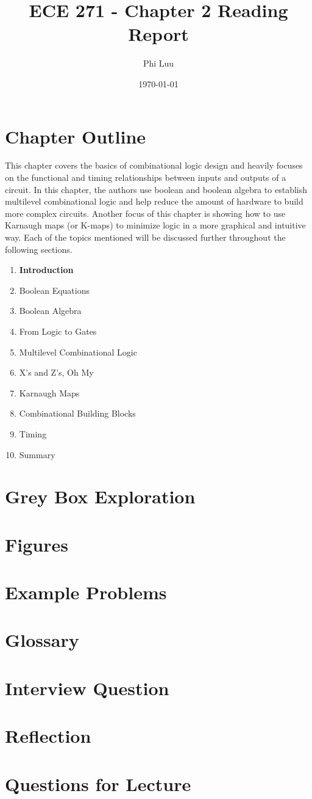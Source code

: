 \documentclass[12pt]{article}
\title{ECE 271 - Chapter 2 Reading Report}
\author{Phi Luu}
\date{\today}
\begin{document}
\maketitle

\section{Chapter Outline}

This chapter covers the basics of combinational logic design and heavily focuses on the functional and timing relationships between inputs and outputs of a circuit. In this chapter, the authors use boolean and boolean algebra to establish multilevel combinational logic and help reduce the amount of hardware to build more complex circuits. Another focus of this chapter is showing how to use Karnaugh maps (or K-maps) to minimize logic in a more graphical and intuitive way. Each of the topics mentioned will be discussed further throughout the following sections.

\begin{enumerate}
    \item \textbf{Introduction}
    \item Boolean Equations
    \item Boolean Algebra
    \item From Logic to Gates
    \item Multilevel Combinational Logic
    \item X's and Z's, Oh My
    \item Karnaugh Maps
    \item Combinational Building Blocks
    \item Timing
    \item Summary
\end{enumerate}

\section{Grey Box Exploration}

\section{Figures}

\section{Example Problems}

\section{Glossary}

\section{Interview Question}

\section{Reflection}

\section{Questions for Lecture}



\end{document}
